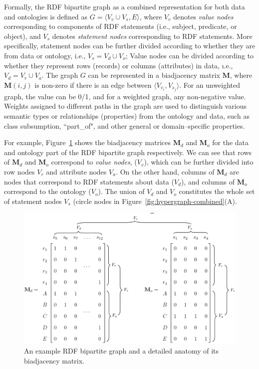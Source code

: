 Formally, the RDF bipartite graph as a combined representation for both data and ontologies is defined as $G=\langle V_v \cup V_s, E \rangle$, where $V_v$ denotes \emph{value nodes} corresponding to components of RDF statements (i.e., subject, predicate, or object), and $V_s$ denotes \emph{statement nodes} corresponding to RDF statements. More specifically, statement nodes can be further divided according to whether they are from data or ontology, i.e., $V_s=V_d \cup V_o$; Value nodes can be divided according to whether they represent rows (records) or columns (attributes) in data, \i.e., $V_d=V_r \cup V_a$. The graph $G$ can be represented in a biadjacency matrix $\mathbf{M}$, where $\mathbf{M}(i,j)$ is non-zero if there is an edge between $\langle V_{v_i}, V_{s_j} \rangle$. For an unweighted graph, the value can be 0/1, and for a weighted graph, any non-negative value. Weights assigned to different paths in the graph are used to distinguish various semantic types or relationships (properties) from the ontology and data, such as class subsumption, ``part\_of", and other general or domain--specific properties.
 
For example, Figure~\ref{fig:biadjacency-matrices} shows the biadjacency matrices $\mathbf{M}_d$ and $\mathbf{M}_o$ for the data and ontology part of the RDF bipartite graph respectively. We can see that rows of $\mathbf{M}_d$ and $\mathbf{M}_o$ correspond to \emph{value nodes}, ($V_v$), which can be further divided into row nodes $V_r$ and attribute nodes $V_a$. On the other hand, columns of $\mathbf{M}_d$ are nodes that correspond to RDF statements about data ($V_d$), and columns of $\mathbf{M}_o$ correspond to the ontology ($V_o$). The union of $V_d$ and $V_o$ constitutes the whole set of statement nodes $V_s$ (circle nodes in Figure~\ref{fig:hypergraph-combined}(A).

\begin{figure}[h!t]
\begin{center}
\includegraphics[width=.7\textwidth]{fig/biadjacency-matrices.eps}
\end{center}
\caption[An example RDF bipartite graph and a detailed anatomy of\protect\newline its biadjacency matrix]{\label{fig:biadjacency-matrices} An example RDF bipartite graph and a detailed anatomy of its biadjacency matrix.}
\end{figure}


